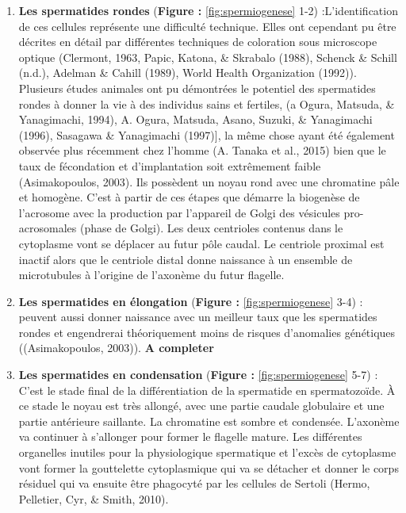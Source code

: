 \documentclass[12pt,twoside]{reedthesis}
\providecommand{\tightlist}{%
  \setlength{\itemsep}{0pt}\setlength{\parskip}{0pt}}
\theoremstyle{definition}
\theoremstyle{definition}
\theoremstyle{remark}
\begin{document}
  \begin{enumerate}
  \def\labelenumi{\arabic{enumi}.}
  \tightlist
  \item
    \textbf{Les spermatides rondes} (\textbf{Figure :
    }\ref{fig:spermiogenese} 1-2) :L'identification de ces cellules
    représente une difficulté technique. Elles ont cependant pu être
    décrites en détail par différentes techniques de coloration sous
    microscope optique (Clermont, 1963, Papic, Katona, \& Skrabalo (1988),
    Schenck \& Schill (n.d.), Adelman \& Cahill (1989), World Health
    Organization (1992)). Plusieurs études animales ont pu démontrées le
    potentiel des spermatides rondes à donner la vie à des individus sains
    et fertiles, (a Ogura, Matsuda, \& Yanagimachi, 1994), A. Ogura,
    Matsuda, Asano, Suzuki, \& Yanagimachi (1996), Sasagawa \& Yanagimachi
    (1997){]}, la même chose ayant été également observée plus récemment
    chez l'homme (A. Tanaka et al., 2015) bien que le taux de fécondation
    et d'implantation soit extrêmement faible (Asimakopoulos, 2003). Ils
    possèdent un noyau rond avec une chromatine pâle et homogène. C'est à
    partir de ces étapes que démarre la biogenèse de l'acrosome avec la
    production par l'appareil de Golgi des vésicules pro-acrosomales
    (phase de Golgi). Les deux centrioles contenus dans le cytoplasme vont
    se déplacer au futur pôle caudal. Le centriole proximal est inactif
    alors que le centriole distal donne naissance à un ensemble de
    microtubules à l'origine de l'axonème du futur flagelle.\\
  \item
    \textbf{Les spermatides en élongation} (\textbf{Figure :
    }\ref{fig:spermiogenese} 3-4) :\\
    peuvent aussi donner naissance avec un meilleur taux que les
    spermatides rondes et engendrerai théoriquement moins de risques
    d'anomalies génétiques ((Asimakopoulos, 2003)). \textbf{A completer}\\
  \item
    \textbf{Les spermatides en condensation} (\textbf{Figure :
    }\ref{fig:spermiogenese} 5-7) : C'est le stade final de la
    différentiation de la spermatide en spermatozoïde. À ce stade le noyau
    est très allongé, avec une partie caudale globulaire et une partie
    antérieure saillante. La chromatine est sombre et condensée. L'axonème
    va continuer à s'allonger pour former le flagelle mature. Les
    différentes organelles inutiles pour la physiologique spermatique et
    l'excès de cytoplasme vont former la gouttelette cytoplasmique qui va
    se détacher et donner le corps résiduel qui va ensuite être phagocyté
    par les cellules de Sertoli (Hermo, Pelletier, Cyr, \& Smith, 2010).
  \end{enumerate}
  
\end{document}
